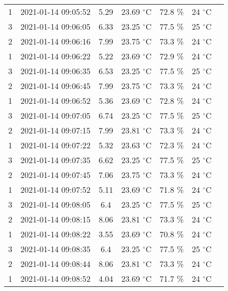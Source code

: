 \begin{itemize}
\begin{table}[H]
\begin{tabular}{ccccccc}
                      1 & 2021-01-14 09:05:52 & 5.29 & 23.69 $^{\circ}$C & 72.8 \% & 24 $^{\circ}$C \\  
                     3 & 2021-01-14 09:06:05 & 6.33 & 23.25 $^{\circ}$C & 77.5 \% & 25 $^{\circ}$C   \\  
                     2 & 2021-01-14 09:06:16  & 7.99 & 23.75 $^{\circ}$C & 73.3 \% & 24 $^{\circ}$C \\  
                    1 & 2021-01-14 09:06:22   & 5.22 & 23.69 $^{\circ}$C & 72.9 \% & 24 $^{\circ}$C\\  
            		3 & 2021-01-14 09:06:35 & 6.53 & 23.25 $^{\circ}$C & 77.5 \% & 25 $^{\circ}$C  \\
            		2 & 2021-01-14 09:06:45 & 7.99 & 23.75 $^{\circ}$C & 73.3 \% & 24 $^{\circ}$C \\
            		1 & 2021-01-14 09:06:52 & 5.36 & 23.69 $^{\circ}$C & 72.8 \% & 24 $^{\circ}$C \\
            		3 & 2021-01-14 09:07:05 & 6.74 & 23.25 $^{\circ}$C & 77.5 \% & 25 $^{\circ}$C  \\
                    2 & 2021-01-14 09:07:15 & 7.99 & 23.81 $^{\circ}$C & 73.3 \% & 24 $^{\circ}$C  \\
                    1 & 2021-01-14 09:07:22 & 5.32 & 23.63 $^{\circ}$C & 72.3 \% & 24 $^{\circ}$C  \\
                    3 & 2021-01-14 09:07:35 & 6.62 & 23.25 $^{\circ}$C & 77.5 \% & 25 $^{\circ}$C   \\
                    2 & 2021-01-14 09:07:45 & 7.06 & 23.75 $^{\circ}$C & 73.3 \% & 24 $^{\circ}$C  \\
                    1 & 2021-01-14 09:07:52 & 5.11 & 23.69 $^{\circ}$C & 71.8 \% & 24 $^{\circ}$C \\ 
                      3 & 2021-01-14 09:08:05&  6.4 & 23.25 $^{\circ}$C & 77.5 \% & 25 $^{\circ}$C  \\  
                    2 & 2021-01-14 09:08:15 &  8.06 & 23.81 $^{\circ}$C & 73.3 \% & 24 $^{\circ}$C   \\  
                    1 & 2021-01-14 09:08:22 &  3.55 & 23.69 $^{\circ}$C & 70.8 \% & 24 $^{\circ}$C  \\  
                     3 & 2021-01-14 09:08:35 &  6.4 & 23.25 $^{\circ}$C & 77.5 \% & 25 $^{\circ}$C  \\  
                    2 & 2021-01-14 09:08:44 &  8.06 & 23.81 $^{\circ}$C & 73.3 \% & 24 $^{\circ}$C   \\  
                     1 & 2021-01-14 09:08:52 &  4.04 & 23.69 $^{\circ}$C & 71.7 \% & 24 $^{\circ}$C\\  

\end{tabular}
\end{table}
\end{itemize}
